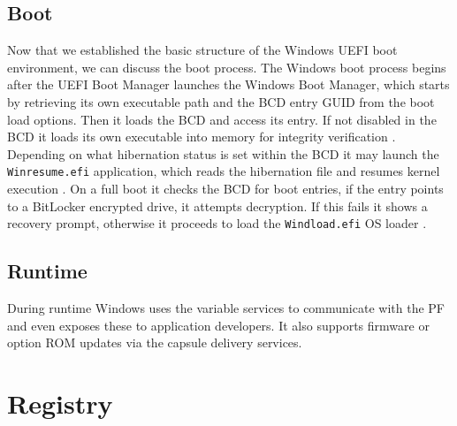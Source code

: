 \subsection{Boot}

Now that we established the basic structure of the Windows UEFI boot environment, we can discuss the boot process.
The Windows boot process begins after the UEFI Boot Manager launches the Windows Boot Manager, which starts by retrieving its own executable path and the \ac{BCD} entry GUID from the boot load options.
Then it loads the \ac{BCD} and access its entry.
If not disabled in the \ac{BCD} it loads its own executable into memory for integrity verification \cite[Section 12]{windows-internals-7-part2}.
Depending on what hibernation status is set within the \ac{BCD} it may launch the \lstinline{Winresume.efi} application, which reads the hibernation file and resumes kernel execution \cite[Section 12]{windows-internals-7-part2}.
On a full boot it checks the \ac{BCD} for boot entries, if the entry points to a BitLocker encrypted drive, it attempts decryption.
If this fails it shows a recovery prompt, otherwise it proceeds to load the \lstinline{Windload.efi} \ac{OS} loader \cite[Section 12]{windows-internals-7-part2}.

\cite[Section 12]{windows-internals-7-part2}

\subsection{Runtime}

During runtime Windows uses the variable services to communicate with the \ac{PF} and even exposes these to application developers.
It also supports firmware or option \ac{ROM} updates via the capsule delivery services.

\section{Registry}


